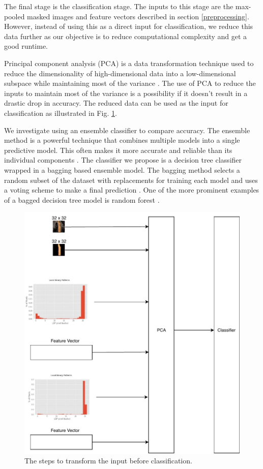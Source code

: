 The final stage is the classification stage. The inputs to this stage are the max-pooled masked images and feature vectors described in section \ref{preprocessing}. However, instead of using this as a direct input for classification, we reduce this data further as our objective is to reduce computational complexity and get a good runtime.

Principal component analysis (PCA) is a data transformation technique used to reduce the dimensionality of high-dimensional data into a low-dimensional subspace while maintaining most of the variance \cite{b5_1,b5_2}. The use of PCA to reduce the inputs to maintain most of the variance is a possibility if it doesn't result in a drastic drop in accuracy. The reduced data can be used as the input for classification as illustrated in Fig. \ref{fig:pca}.

We investigate using an ensemble classifier to compare accuracy. The ensemble method is a powerful technique that combines multiple models into a single predictive model. This often makes it more accurate and reliable than its individual components \cite{b5_3}. The classifier we propose is a decision tree classifier wrapped in a bagging based ensemble model. The bagging method selects a random subset of the dataset with replacements for training each model and uses a voting scheme to make a final prediction \cite{b5_4}. One of the more prominent examples of a bagged decision tree model is random forest \cite{b5_5}.

\begin{figure}[tp]
	\centerline{\includegraphics[scale=0.5]{./img/pca.pdf}}
	\caption{The steps to transform the input before classification.}
	\label{fig:pca}
\end{figure}